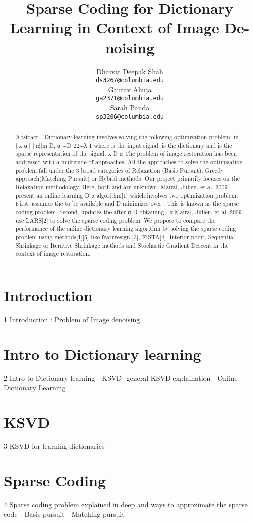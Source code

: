\documentclass{article} %
\title{Sparse Coding for Dictionary Learning in Context of Image De-noising}
\author{
Dhaivat Deepak Shah\\
\texttt{ds3267@columbia.edu} \\
\And
Gaurav Ahuja\\
\texttt{ga2371@columbia.edu} \\
\And
Sarah Panda\\
\texttt{sp3206@columbia.edu} \\
}
\begin{document}
\maketitle


\begin{abstract}
Abstract - 
Dictionary learning involves solving the following optimization problem: in 
||x α|| ||α||m D, α −D 22+λ 1 where  is the input signal,   is the dictionary and   is the sparse representation of the signal. 
x D α  
The problem of image restoration has been addressed with a multitude of approaches. All the approaches to solve the optimisation problem fall under the 3 broad categories of  Relaxation (Basis Pursuit), Greedy approach(Matching Pursuit) or Hybrid methods. Our project  primarily focuses on the Relaxation methodology.
Here, both   and   are unknown. Mairal, Julien, et al, 2009 present an online learning D α   algorithm[1] which involves two optimization problem. First, assumes the   to be available and D   minimizes over . This is known as the sparse coding problem. Second, updates the   after α D   obtaining  . α  
Mairal, Julien, et al, 2009 use LARS[2]  to solve the sparse coding problem. We propose to  compare the performance of the online dictionary learning algorithm by solving the sparse coding  problem using methods[1][5] like feature­sign [3], FISTA[4], Interior point, Sequential Shrinkage or  Iterative Shrinkage methods and Stochastic Gradient Descent in the context of image  restoration.
\end{abstract}

\vspace{-.2cm}
\section{Introduction}
\vspace{-.2cm}
1 Introduction : Problem of Image denoising

\section{Intro to Dictionary learning}
2  Intro to Dictionary learning
  -	KSVD-  general KSVD explaination
  -	Online Dictionary Learning

\section{KSVD}
3  KSVD for learning dictionaries

\section{Sparse Coding}
4 Sparse coding problem explained in deep and ways to approximate the sparse code
  -	Basis pursuit
  -	Matching pursuit 
\end{document}
